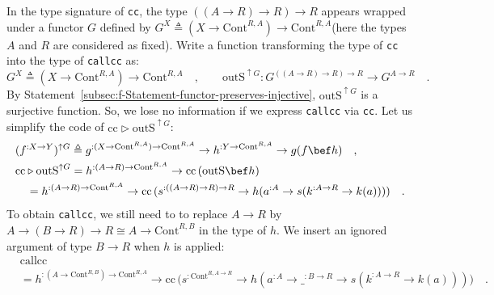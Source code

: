 In the type signature of \lstinline!cc!, the type $((A\rightarrow R)\rightarrow R)\rightarrow R$
appears wrapped under a functor $G$ defined by $G^{X}\triangleq(X\rightarrow\text{Cont}^{R,A})\rightarrow\text{Cont}^{R,A}$(here
the types $A$ and $R$ are considered as fixed). Write a function
transforming the type of \lstinline!cc! into the type of \lstinline!callcc!
as:
\[
G^{X}\triangleq(X\rightarrow\text{Cont}^{R,A})\rightarrow\text{Cont}^{R,A}\quad,\quad\quad\text{outS}^{\uparrow G}:G^{((A\rightarrow R)\rightarrow R)\rightarrow R}\rightarrow G^{A\rightarrow R}\quad.
\]
By Statement~\ref{subsec:f-Statement-functor-preserves-injective},
$\text{outS}^{\uparrow G}$ is a surjective function. So, we lose
no information if we express \lstinline!callcc! via \lstinline!cc!.
Let us simplify the code of $\text{cc}\triangleright\text{outS}^{\uparrow G}$:
\begin{align*}
 & (f^{:X\rightarrow Y})^{\uparrow G}\triangleq g^{:(X\rightarrow\text{Cont}^{R,A})\rightarrow\text{Cont}^{R,A}}\rightarrow h^{:Y\rightarrow\text{Cont}^{R,A}}\rightarrow g(f\bef h)\quad,\\
 & \text{cc}\triangleright\text{outS}^{\uparrow G}=h^{:(A\rightarrow R)\rightarrow\text{Cont}^{R,A}}\rightarrow\text{cc}\,(\text{outS}\bef h)\\
 & \quad=h^{:(A\rightarrow R)\rightarrow\text{Cont}^{R,A}}\rightarrow\text{cc}\,(s^{:((A\rightarrow R)\rightarrow R)\rightarrow R}\rightarrow h(a^{:A}\rightarrow s(k^{:A\rightarrow R}\rightarrow k(a))))\quad.
\end{align*}
To obtain \lstinline!callcc!, we still need to to replace $A\rightarrow R$
by $A\rightarrow\left(B\rightarrow R\right)\rightarrow R\cong A\rightarrow\text{Cont}^{R,B}$
in the type of $h$. We insert an ignored argument of type $B\rightarrow R$
when $h$ is applied: 
\begin{align*}
 & \text{callcc}\\
 & =h^{:(A\rightarrow\text{Cont}^{R,B})\rightarrow\text{Cont}^{R,A}}\rightarrow\text{cc}\,\big(s^{:\text{Cont}^{R,A\rightarrow R}}\rightarrow h(a^{:A}\rightarrow\_^{:B\rightarrow R}\rightarrow s(k^{:A\rightarrow R}\rightarrow k(a)))\big)\quad.
\end{align*}

